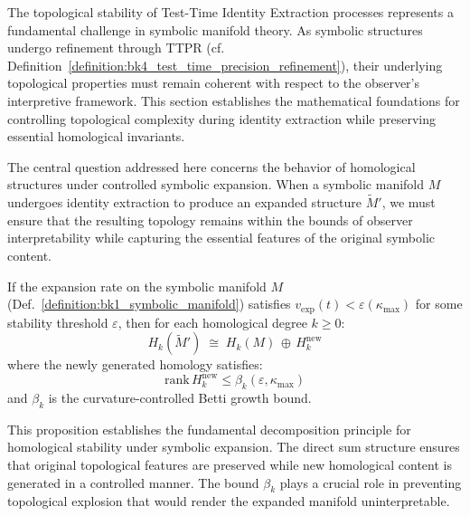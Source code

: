 The topological stability of Test-Time Identity Extraction processes represents a fundamental challenge in symbolic manifold theory. As symbolic structures undergo refinement through TTPR (cf. Definition~\ref{definition:bk4_test_time_precision_refinement}), their underlying topological properties must remain coherent with respect to the observer's interpretive framework. This section establishes the mathematical foundations for controlling topological complexity during identity extraction while preserving essential homological invariants.

The central question addressed here concerns the behavior of homological structures under controlled symbolic expansion. When a symbolic manifold $M$ undergoes identity extraction to produce an expanded structure $\widetilde{M}'$, we must ensure that the resulting topology remains within the bounds of observer interpretability while capturing the essential features of the original symbolic content.

\begin{proposition}
\label{proposition:bk4_homological_extension}
If the expansion rate on the symbolic manifold $M$ (Def.~\ref{definition:bk1_symbolic_manifold}) satisfies $v_{\text{exp}}(t)<\varepsilon(\kappa_{\max})$ for some stability threshold $\varepsilon$, then for each homological degree $k\ge0$:
\[
H_k(\widetilde{M}')\;\cong\;
H_k(M)\,\oplus\,H_k^{\mathrm{new}}
\]
where the newly generated homology satisfies:
\[
\text{rank}\,H_k^{\mathrm{new}}\le
\beta_k(\varepsilon,\kappa_{\max})
\]
and $\beta_k$ is the curvature-controlled Betti growth bound.
\end{proposition}

This proposition establishes the fundamental decomposition principle for homological stability under symbolic expansion. The direct sum structure ensures that original topological features are preserved while new homological content is generated in a controlled manner. The bound $\beta_k$ plays a crucial role in preventing topological explosion that would render the expanded manifold uninterpretable.

